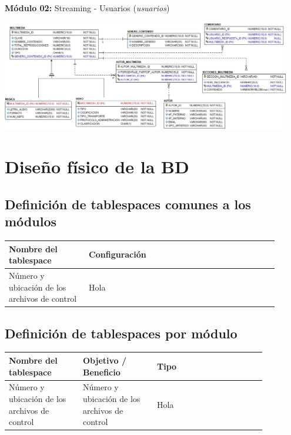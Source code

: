 \documentclass{article}
\def\arraystretch{1}
\begin{document}
\textbf{Módulo 02:} Streaming - Usuarios (\textit{usuarios})

\begin{center}
\includegraphics[width=0.95\textwidth]{media-stream-modulo-01}
\end{center}

\section{Diseño físico de la BD}

\subsection{Definición de tablespaces comunes a los módulos}

{
  \setlength\tabcolsep{3.5mm}
  \def\arraystretch{2}          %
  \begin{longtable}{
    |p{0.27\linewidth}
    |p{0.64\linewidth}|}
  \hline
  \textbf{Nombre del tablespace} & 
  \textbf{Configuración}
  \\ \hline
  Número y ubicación de los archivos de control & 
  Hola%
  \\ \hline
  \end{longtable}
}

\subsection{Definición de tablespaces por módulo}

{
  \setlength\tabcolsep{3.5mm}
  \def\arraystretch{2}          %
  \begin{longtable}{
    |p{0.25\linewidth}
    |p{0.25\linewidth}
    |p{0.37\linewidth}|}
  \hline
  \textbf{Nombre del tablespace} & 
  \textbf{Objetivo / Beneficio} & 
  \textbf{Tipo}
  \\ \hline
  Número y ubicación de los archivos de control & 
  Número y ubicación de los archivos de control & 
  Hola%
  \\ \hline
  \end{longtable}
}
\end{document}

